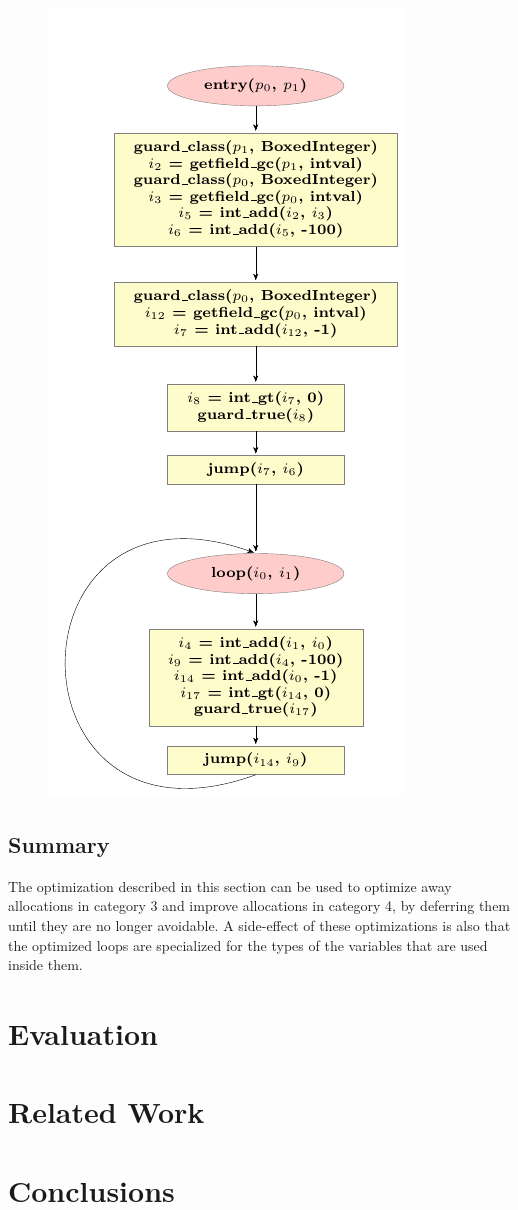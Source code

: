 \documentclass{sigplanconf}
\begin{document}
\begin{figure}
\includegraphics{figures/step4.pdf}
\end{figure}



\subsection{Summary}

The optimization described in this section can be used to optimize away
allocations in category 3 and improve allocations in category 4, by deferring
them until they are no longer avoidable. A side-effect of these optimizations
is also that the optimized loops are specialized for the types of the variables
that are used inside them.


\section{Evaluation}
\label{sec:Evaluation}


\section{Related Work}
\label{sec:related}

\section{Conclusions}
\label{sec:conclusions}



\end{document}
